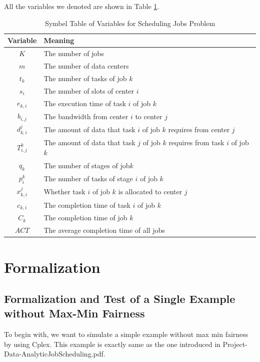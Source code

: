 \documentclass{llncs}
\begin{document}
All the variables we denoted are shown in Table \ref{tab:variables}.\\
\begin{table}[h]
    \centering
    \caption{Symbel Table of Variables for Scheduling Jobs Problem}\label{tab:variables}
    \begin{tabular}{c|l}
    \hline
         Variable & Meaning\\
    \hline
        $K$ & The number of jobs\\
        $m$ & The number of data centers\\
        $t_k$ & The number of tasks of job $k$\\
        $s_i$ & The number of slots of center $i$\\
        $e_{k,i}$ & The execution time of task $i$ of job $k$\\
        $b_{i,j}$ & The bandwidth from center $i$ to center $j$\\
        $d_{k,i}^j$ & The amount of data that task $i$ of job $k$ requires from center $j$\\
        $T_{i,j}^k$ & The amount of data that task $j$ of job $k$ requires from task $i$ of job $k$\\
        $q_k$ & The number of stages of job$k$\\
        $p_i^k$ & The number of tasks of stage $i$ of job $k$\\
        $x_{k,i}^j$ & Whether task $i$ of job $k$ is allocated to center $j$\\
        $c_{k,i}$ & The completion time of task $i$ of job $k$\\
        $C_k$ & The completion time of job $k$\\
        $ACT$ & The average completion time of all jobs\\
    \hline
    \end{tabular}
\end{table}

\section{Formalization}
\subsection{Formalization and Test of a Single Example without Max-Min Fairness}

To begin with, we want to simulate a simple example without max min fairness by using Cplex. This example is exactly same as the one introduced in Project-Data-AnalyticJobScheduling.pdf.
\end{document}
